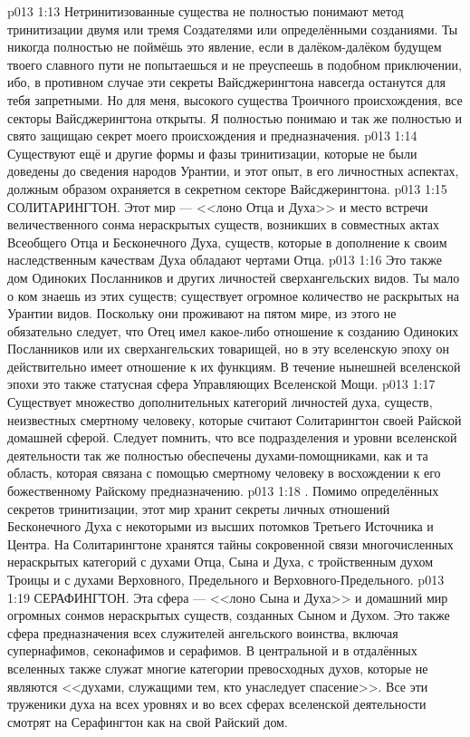 \vs p013 1:13 Нетринитизованные существа не полностью понимают метод тринитизации двумя или тремя Создателями или определёнными созданиями. Ты никогда полностью не поймёшь это явление, если в далёком\hyp{}далёком будущем твоего славного пути не попытаешься и не преуспеешь в подобном приключении, ибо, в противном случае эти секреты Вайсджерингтона навсегда останутся для тебя запретными. Но для меня, высокого существа Троичного происхождения, все секторы Вайсджерингтона открыты. Я полностью понимаю и так же полностью и свято защищаю секрет моего происхождения и предназначения.
\vs p013 1:14 Существуют ещё и другие формы и фазы тринитизации, которые не были доведены до сведения народов Урантии, и этот опыт, в его личностных аспектах, должным образом охраняется в секретном секторе Вайсджерингтона.
\vs p013 1:15 СОЛИТАРИНГТОН. Этот мир --- <<лоно Отца и Духа>> и место встречи величественного сонма нераскрытых существ, возникших в совместных актах Всеобщего Отца и Бесконечного Духа, существ, которые в дополнение к своим наследственным качествам Духа обладают чертами Отца.
\vs p013 1:16 Это также дом Одиноких Посланников и других личностей сверхангельских видов. Ты мало о ком знаешь из этих существ; существует огромное количество не раскрытых на Урантии видов. Поскольку они проживают на пятом мире, из этого не обязательно следует, что Отец имел какое\hyp{}либо отношение к созданию Одиноких Посланников или их сверхангельских товарищей, но в эту вселенскую эпоху он действительно имеет отношение к их функциям. В течение нынешней вселенской эпохи это также статусная сфера Управляющих Вселенской Мощи.
\vs p013 1:17 Существует множество дополнительных категорий личностей духа, существ, неизвестных смертному человеку, которые считают Солитарингтон своей Райской домашней сферой. Следует помнить, что все подразделения и уровни вселенской деятельности так же полностью обеспечены духами\hyp{}помощниками, как и та область, которая связана с помощью смертному человеку в восхождении к его божественному Райскому предназначению.
\vs p013 1:18 \pc {}. Помимо определённых секретов тринитизации, этот мир хранит секреты личных отношений Бесконечного Духа с некоторыми из высших потомков Третьего Источника и Центра. На Солитарингтоне хранятся тайны сокровенной связи многочисленных нераскрытых категорий с духами Отца, Сына и Духа, с тройственным духом Троицы и с духами Верховного, Предельного и Верховного\hyp{}Предельного.
\vs p013 1:19 СЕРАФИНГТОН. Эта сфера --- <<лоно Сына и Духа>> и домашний мир огромных сонмов нераскрытых существ, созданных Сыном и Духом. Это также сфера предназначения всех служителей ангельского воинства, включая супернафимов, секонафимов и серафимов. В центральной и в отдалённых вселенных также служат многие категории превосходных духов, которые не являются <<духами, служащими тем, кто унаследует спасение>>. Все эти труженики духа на всех уровнях и во всех сферах вселенской деятельности смотрят на Серафингтон как на свой Райский дом.
